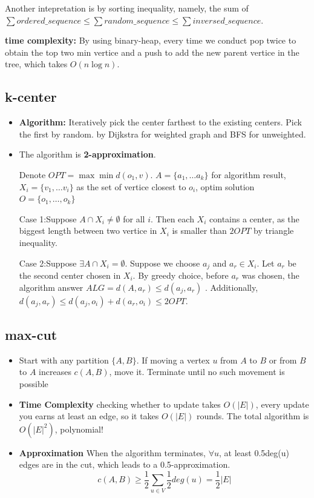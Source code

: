\documentclass{article}
\begin{document}
    Another intepretation is by sorting inequality, namely, the sum of $\sum ordered\_sequence \leq \sum random\_sequence \leq \sum inversed\_sequence$.

    \textbf{time complexity:} By using binary-heap, every time we conduct pop twice to obtain the top two min vertice and a push to add the new parent vertice in the tree, which takes $O(n\log n)$.

    \subsection{k-center}
    \begin{itemize}
    \item \textbf{Algorithm:} Iteratively pick the center farthest to the existing centers. Pick the first by random. by Dijkstra for weighted graph and BFS for unweighted.\\
\item The algorithm is \textbf{2-approximation}.

Denote $OPT=\max \min d(o_1,v)$. $A=\{a_1,\ldots a_k\}$ for algorithm result, $X_i=\{v_1,\ldots v_i\}$ as the set of vertice closest to $o_i$, optim solution $O=\{o_1,\ldots, o_k\}$

Case 1:Suppose $A\cap X_i \neq \emptyset$ for all $i$. Then each $X_i$ contains a center, as the biggest length between two vertice in $X_i$ is smaller than $2OPT$ by triangle inequality.

Case 2:Suppose $\exists A \cap X_i =\emptyset$. Suppose we choose $a_j$ and $a_r\in X_i$. Let $a_r$ be the second center chosen in $X_i$.
By greedy choice, before $a_r$ was chosen, the algorithm answer $ALG =d(A,a_r)\leq d(a_j,a_r)$ . Additionally, $d(a_j,a_r)\leq d(a_j,o_i)+d(a_r,o_i)\leq 2OPT$.
    \end{itemize}
\subsection{max-cut}
\begin{itemize}
    \item  Start with any partition $\{A,B\}$.
If moving a vertex $u$ from $A$ to $B$ or from $B$ to $A$ increases 
$c(A,B)$, move it. Terminate until no such movement is possible
    \item \textbf{Time Complexity} checking whether to update takes $O(|E|)$, every update you earns at least an edge, so it takes $O(|E|)$ rounds. The total algorithm is $O(|E|^2)$, polynomial!
    \item \textbf{Approximation} When the algorithm terminates, $\forall u$, at least 0.5deg(u) edges are in the cut, which leads to a 0.5-approximation.
     \[c(A,B)\geq \frac{1}{2}\sum_{u\in V}\frac{1}{2}deg(u)=\frac{1}{2}|E|\]
\end{itemize}
\end{document}
